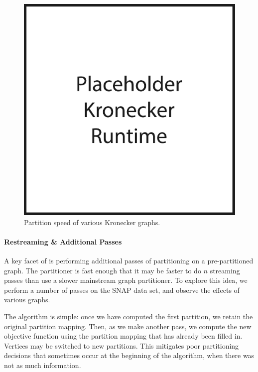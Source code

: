 \begin{figure}[h!]
\centering
  \includegraphics[width=0.8\columnwidth]{figures/kronecker_speed_tests.pdf}
  \caption{Partition speed of various Kronecker graphs.}
  \label{fig:kronspeed}
\end{figure}




\paragraph{Restreaming \& Additional Passes}
A key facet of \ourmethod is performing additional passes of partitioning on a pre-partitioned graph. 
The partitioner is fast enough that it may be faster to do $n$ streaming passes than use a slower mainstream graph partitioner.
To explore this idea, we perform a number of passes on the SNAP data set, and observe the effects of various graphs. 

The algorithm is simple: once we have computed the first partition, we retain the original partition mapping. 
Then, as we make another pass, we compute the new objective function using the partition mapping that has already been filled in. 
Vertices may be switched to new partitions. 
This mitigates poor partitioning decisions that sometimes occur at the beginning of the algorithm, when there was not as much information.

